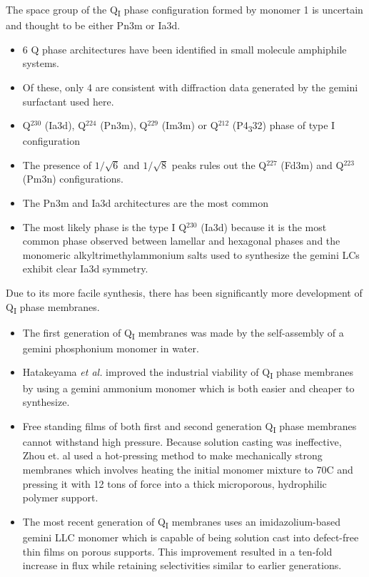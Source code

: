   The space group of the Q\textsubscript{I} phase configuration formed by
  monomer 1 is uncertain and thought to be either Pn3m or Ia3d.  %
  \begin{itemize}
    \item 6 Q phase architectures have been identified in small molecule
    amphiphile systems.~\cite{mariani_cubic_1988}
    \item Of these, only 4 are consistent with diffraction data generated
    by the gemini surfactant used here.~\cite{pindzola_cross-linked_2003}
    \item Q$^{230}$ (Ia3d), Q$^{224}$ (Pn3m), Q$^{229}$ (Im3m) or Q$^{212}$ (P4\textsubscript{3}32) phase of type I configuration
    \item The presence of $1 / \sqrt{6}$ and $1 / \sqrt{8}$ peaks rules out the
    Q$^{227}$ (Fd3m) and Q$^{223}$ (Pm3n) configurations.
    \item The Pn3m and Ia3d architectures are the most common~\cite{mariani_cubic_1988,wiesenauer_nanoporous_2012}
    \item The most likely phase is the type I Q$^{230}$ (Ia3d) because it is the
    most common phase observed between lamellar and hexagonal phases and the
    monomeric alkyltrimethylammonium salts used to synthesize the gemini LCs
    exhibit clear Ia3d symmetry.
  \end{itemize}

  Due to its more facile synthesis, there has been significantly more development
  of Q\textsubscript{I} phase membranes.
  \begin{itemize}
    \item The first generation of Q\textsubscript{I} membranes was made by 
    the self-assembly of a gemini phosphonium monomer in water.~\cite{pindzola_cross-linked_2003}
    \item Hatakeyama \textit{et al.} improved the industrial viability of Q\textsubscript{I} 
    phase membranes by using a gemini ammonium monomer which is both easier and cheaper
    to synthesize.~\cite{hatakeyama_nanoporous_2010}
    \item Free standing films of both first and second generation Q\textsubscript{I} phase 
    membranes cannot withstand high pressure. Because solution casting was ineffective, Zhou
    et. al used a hot-pressing method to make mechanically strong membranes which involves 
    heating the initial monomer mixture to 70\degree C and pressing it with 12 tons of force
    into a thick microporous, hydrophilic polymer support.~\cite{zhou_new_2007}
    \item The most recent generation of Q\textsubscript{I} membranes uses an imidazolium-based
    gemini LLC monomer which is capable of being solution cast into defect-free thin films on
    porous supports. This improvement resulted in a ten-fold increase in flux while retaining
    selectivities similar to earlier generations.~\cite{carter_glycerol-based_2012}
  \end{itemize}
  
